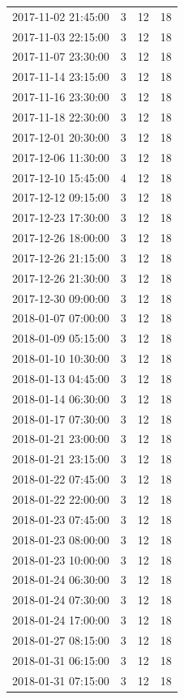 \begin{tabular}{lrrr}
2017-11-02 21:45:00 & 3 & 12 & 18 \\
2017-11-03 22:15:00 & 3 & 12 & 18 \\
2017-11-07 23:30:00 & 3 & 12 & 18 \\
2017-11-14 23:15:00 & 3 & 12 & 18 \\
2017-11-16 23:30:00 & 3 & 12 & 18 \\
2017-11-18 22:30:00 & 3 & 12 & 18 \\
2017-12-01 20:30:00 & 3 & 12 & 18 \\
2017-12-06 11:30:00 & 3 & 12 & 18 \\
2017-12-10 15:45:00 & 4 & 12 & 18 \\
2017-12-12 09:15:00 & 3 & 12 & 18 \\
2017-12-23 17:30:00 & 3 & 12 & 18 \\
2017-12-26 18:00:00 & 3 & 12 & 18 \\
2017-12-26 21:15:00 & 3 & 12 & 18 \\
2017-12-26 21:30:00 & 3 & 12 & 18 \\
2017-12-30 09:00:00 & 3 & 12 & 18 \\
2018-01-07 07:00:00 & 3 & 12 & 18 \\
2018-01-09 05:15:00 & 3 & 12 & 18 \\
2018-01-10 10:30:00 & 3 & 12 & 18 \\
2018-01-13 04:45:00 & 3 & 12 & 18 \\
2018-01-14 06:30:00 & 3 & 12 & 18 \\
2018-01-17 07:30:00 & 3 & 12 & 18 \\
2018-01-21 23:00:00 & 3 & 12 & 18 \\
2018-01-21 23:15:00 & 3 & 12 & 18 \\
2018-01-22 07:45:00 & 3 & 12 & 18 \\
2018-01-22 22:00:00 & 3 & 12 & 18 \\
2018-01-23 07:45:00 & 3 & 12 & 18 \\
2018-01-23 08:00:00 & 3 & 12 & 18 \\
2018-01-23 10:00:00 & 3 & 12 & 18 \\
2018-01-24 06:30:00 & 3 & 12 & 18 \\
2018-01-24 07:30:00 & 3 & 12 & 18 \\
2018-01-24 17:00:00 & 3 & 12 & 18 \\
2018-01-27 08:15:00 & 3 & 12 & 18 \\
2018-01-31 06:15:00 & 3 & 12 & 18 \\
2018-01-31 07:15:00 & 3 & 12 & 18 \\

\end{tabular}
